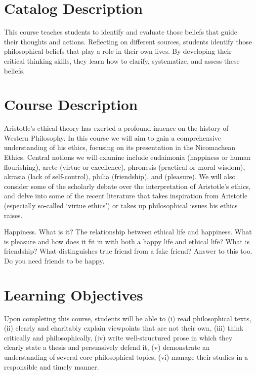 \documentclass[article,oneside]{memoir}
\begin{document}
\section{Catalog Description}

This course teaches students to identify and evaluate those beliefs that guide their thoughts and actions. Reflecting on different sources, students identify those philosophical beliefs that play a role in their own lives. By developing their critical thinking skills, they learn how to clarify, systematize, and assess these beliefs. 

\section{Course Description}

Aristotle's ethical theory has exerted a profound inuence on the history of Western Philosophy.  In this course we will aim to gain a comprehensive understanding of his ethics, focusing on its presentation in the Nicomachean Ethics.  Central notions we will examine include eudaimonia (happiness or human  flourishing), arete (virtue or excellence), phronesis (practical or moral wisdom), akrasia (lack  of  self-control), philia (friendship),  and  (pleasure).   We  will  also  consider  some  of the  scholarly  debate  over  the  interpretation  of  Aristotle's  ethics,  and  delve  into  some  of  the  recent literature that takes inspiration from Aristotle (especially so-called `virtue ethics') or takes up philosophical issues his ethics raises.


Happiness. 
What is it? The relationship between ethical life and happiness. What is pleasure and how does it fit in with both a happy life and ethical life? What is friendship? What distinguishes true friend from a fake friend? Answer to this too. Do you need friends to be happy. 

\section{Learning Objectives}

Upon completing this course, students will be able to (i) read
philosophical texts, (ii) clearly and charitably explain viewpoints that
are not their own, (iii) think critically and philosophically, (iv)
write well-structured prose in which they clearly state a thesis and
persuasively defend it, (v) demonstrate an understanding of several core
philosophical topics, (vi) manage their studies in a responsible and timely manner. 
\end{document}
